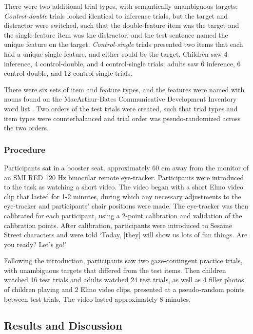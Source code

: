 \documentclass[10pt,letterpaper]{article}
\begin{document}
There were two additional trial types, with semantically unambiguous targets: \emph{Control-double} trials looked identical to inference trials, but the target and distractor were switched, such that the double-feature item was the target and the single-feature item was the distractor, and the test sentence named the unique feature on the target. \emph{Control-single} trials presented two items that each had a unique single feature, and either could be the target. Children saw 4 inference, 4 control-double, and 4 control-single trials; adults saw 6 inference, 6 control-double, and 12 control-single trials. 

There were six sets of item and feature types, and the features were named with nouns found on the  MacArthur-Bates Communicative Development Inventory word list \cite{fenson1994}. Two orders of the test trials were created, such that trial types and item types were counterbalanced and trial order was pseudo-randomized across the two orders.

\subsubsection{Procedure}

Participants sat in a booster seat, approximately 60 cm away from the monitor of an SMI RED 120 Hz binocular remote eye-tracker. Participants were introduced to the task as watching a short video. The video began with a short Elmo video clip that lasted for 1-2 minutes, during which any necessary adjustments to the eye-tracker and participants' chair positions were made. The eye-tracker was then calibrated for each participant, using a 2-point calibration and validation of the calibration points. After calibration, participants were introduced to Sesame Street characters and were told `Today, [they] will show us lots of fun things. Are you ready? Let's go!'

Following the introduction, participants saw two gaze-contingent practice trials, with unambiguous targets that differed from the test items. Then children watched 16 test trials and adults watched 24 test trials, as well as 4 filler photos of children playing and 2 Elmo video clips, presented at a pseudo-random points between test trials. The video lasted approximately 8 minutes.

\subsection{Results and Discussion}
\end{document}

